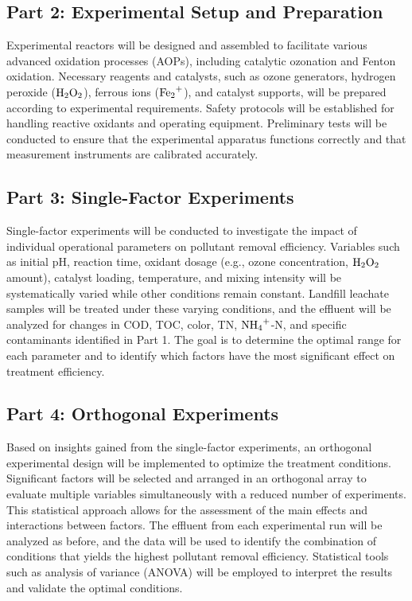 \documentclass[a4paper]{article}
\begin{document}
\subsection*{Part 2: Experimental Setup and Preparation}

Experimental reactors will be designed and assembled to facilitate
various advanced oxidation processes (AOPs), including catalytic
ozonation and Fenton oxidation. Necessary reagents and catalysts, such
as ozone generators, hydrogen peroxide ($\ce{H2O2}$), ferrous ions ($\ce{Fe2+}$), and
catalyst supports, will be prepared according to experimental
requirements. Safety protocols will be established for handling reactive
oxidants and operating equipment. Preliminary tests will be conducted to
ensure that the experimental apparatus functions correctly and that
measurement instruments are calibrated accurately.

\subsection*{Part 3: Single-Factor Experiments}

Single-factor experiments will be conducted to investigate the impact of individual operational parameters on pollutant removal efficiency. Variables such as initial pH, reaction time, oxidant dosage (e.g., ozone concentration, $\ce{H2O2}$ amount), catalyst loading, temperature, and mixing intensity will be systematically varied while other conditions remain constant. Landfill leachate samples will be treated under these varying conditions, and the effluent will be analyzed for changes in COD, TOC, color, TN, $\ce{NH4+}$-N, and specific contaminants identified in Part 1. The goal is to determine the optimal range for each parameter and to identify which factors have the most significant effect on treatment efficiency.

\subsection*{Part 4: Orthogonal Experiments}

Based on insights gained from the single-factor experiments, an orthogonal experimental design will be implemented to optimize the treatment conditions. Significant factors will be selected and arranged in an orthogonal array to evaluate multiple variables simultaneously with a reduced number of experiments. This statistical approach allows for the assessment of the main effects and interactions between factors. The effluent from each experimental run will be analyzed as before, and the data will be used to identify the combination of conditions that yields the highest pollutant removal efficiency. Statistical tools such as analysis of variance (ANOVA) will be employed to interpret the results and validate the optimal conditions.
\end{document}
